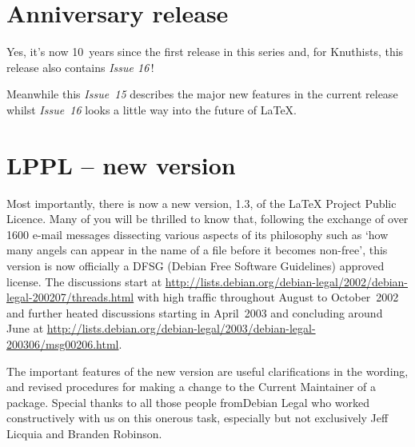 \documentclass{ltnews}
\begin{document}
\maketitle


\section{Anniversary release}

Yes, it's now 10~years since the first release in this series and, for
Knuthists, this release also contains \textit{Issue 16}\,!

Meanwhile this \textit{Issue~15} describes the major new features in
the current release whilst \textit{Issue~16} looks\newline
a little way into the future of \LaTeX{}.


\section{LPPL -- new version}

Most importantly, there is now a new version, 1.3, of the \LaTeX{}
Project Public Licence.   Many of you will\newline
be thrilled to know that, following the exchange of over 1600 e-mail
messages dissecting various aspects of its philosophy such as `how
many angels can appear in the name of a file before it becomes
non-free', this version\newline
is now officially a DFSG (Debian Free Software Guidelines) approved license.
The discussions start at
\url{http://lists.debian.org/debian-legal/2002/debian-legal-200207/threads.html}
with high traffic throughout August to October~2002 and further
heated discussions starting in April~2003 and concluding
around June at
\url{http://lists.debian.org/debian-legal/2003/debian-legal-200306/msg00206.html}.

The important features of the new version are useful clarifications in
the wording, and revised procedures\newline
for making a change to the Current Maintainer of a package.  Special
thanks to all those people from\newline Debian Legal who worked
constructively with us\newline
on this onerous task, especially but not exclusively\newline
Jeff Licquia and Branden Robinson.
\end{document}
